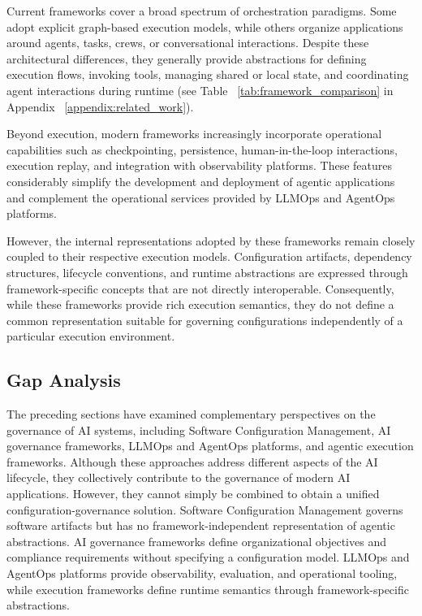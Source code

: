 \documentclass[10pt]{article}
\begin{document}
Current frameworks cover a broad spectrum of orchestration paradigms. Some adopt explicit graph-based execution models, while others organize applications around agents, tasks, crews, or conversational interactions. Despite these architectural differences, they generally provide abstractions for defining execution flows, invoking tools, managing shared or local state, and coordinating agent interactions during runtime (see Table ~\ref{tab:framework_comparison} in Appendix ~\ref{appendix:related_work}).

Beyond execution, modern frameworks increasingly incorporate operational capabilities such as checkpointing, persistence, human-in-the-loop interactions, execution replay, and integration with observability platforms. These features considerably simplify the development and deployment of agentic applications and complement the operational services provided by LLMOps and AgentOps platforms.

However, the internal representations adopted by these frameworks remain closely coupled to their respective execution models. Configuration artifacts, dependency structures, lifecycle conventions, and runtime abstractions are expressed through framework-specific concepts that are not directly interoperable. Consequently, while these frameworks provide rich execution semantics, they do not define a common representation suitable for governing configurations independently of a particular execution environment.



\subsection{Gap Analysis}
\label{sec:gap_analysis}

The preceding sections have examined complementary perspectives on the governance of AI systems, including Software Configuration Management, AI governance frameworks, LLMOps and AgentOps platforms, and agentic execution frameworks. Although these approaches address different aspects of the AI lifecycle, they collectively contribute to the governance of modern AI applications. However, they cannot simply be combined to obtain a unified configuration-governance solution. Software Configuration Management governs software artifacts but has no framework-independent representation of agentic abstractions. AI governance frameworks define organizational objectives and compliance requirements without specifying a configuration model. LLMOps and AgentOps platforms provide observability, evaluation, and operational tooling, while execution frameworks define runtime semantics through framework-specific abstractions. 
\end{document}
